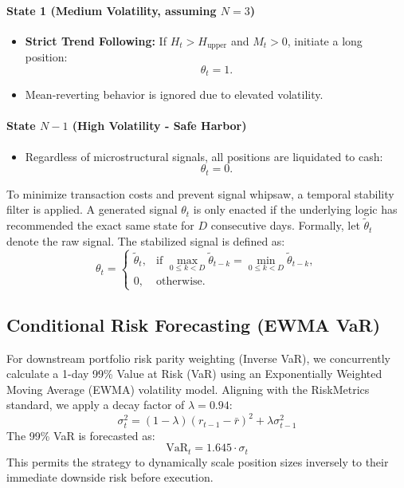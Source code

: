 \documentclass[12pt]{article}
\begin{document}
\paragraph{State 1 (Medium Volatility, assuming $N=3$)}
\begin{itemize}
    \item \textbf{Strict Trend Following:} If $H_t > H_{\text{upper}}$ and $M_t > 0$, initiate a long position:
    \[
    \theta_t = 1.
    \]
    \item Mean-reverting behavior is ignored due to elevated volatility.
\end{itemize}

\paragraph{State $N-1$ (High Volatility - Safe Harbor)}
\begin{itemize}
    \item Regardless of microstructural signals, all positions are liquidated to cash:
    \[
    \theta_t = 0.
    \]
\end{itemize}

To minimize transaction costs and prevent signal whipsaw, a temporal stability filter is applied. A generated signal $\theta_t$ is only enacted if the underlying logic has recommended the exact same state for $D$ consecutive days. Formally, let $\tilde{\theta}_t$ denote the raw signal. The stabilized signal is defined as:
\[
\theta_t =
\begin{cases}
\tilde{\theta}_t, & \text{if } \max_{0 \leq k < D} \tilde{\theta}_{t-k} = \min_{0 \leq k < D} \tilde{\theta}_{t-k}, \\
0, & \text{otherwise.}
\end{cases}
\]

\subsection{Conditional Risk Forecasting (EWMA VaR)}
For downstream portfolio risk parity weighting (Inverse VaR), we concurrently calculate a 1-day 99\% Value at Risk (VaR) using an Exponentially Weighted Moving Average (EWMA) volatility model. Aligning with the RiskMetrics standard, we apply a decay factor of $\lambda = 0.94$: $$ \sigma_t^2 = (1 - \lambda) (r_{t-1} - \bar{r})^2 + \lambda \sigma_{t-1}^2 $$ The 99\% VaR is forecasted as: $$ \text{VaR}_{t} = 1.645 \cdot \sigma_t $$ This permits the strategy to dynamically scale position sizes inversely to their immediate downside risk before execution.
\end{document}
